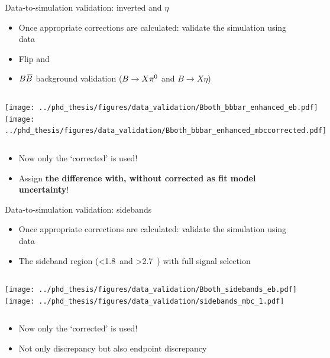 \documentclass[xcolor=dvipsnames]{beamer}
\begin{document}
\begin{frame}{Data-to-simulation validation: inverted \piz and $\eta$}
   \scriptsize\centering
   \begin{itemize}
      \item Once appropriate corrections are calculated: validate the simulation using data
      \item Flip \piVeto and \etaVeto
      \item[\ra]  $B\kern 0.18em\overline{\kern -0.18em B}{}$ background validation ($B\rightarrow X \pi^0$ and $B\to X \eta$)
   \end{itemize}

   \begin{columns}
      \texttt{[image: ../phd\_thesis/figures/data\_validation/Bboth\_bbbar\_enhanced\_eb.pdf]}
      \texttt{[image: ../phd\_thesis/figures/data\_validation/Bboth\_bbbar\_enhanced\_mbccorrected.pdf]}
   \end{columns}

   \begin{itemize}
      \item Now only the `corrected' \Mbc is used!
      \item Assign \textbf{the difference with, without corrected \Mbc as fit model uncertainty}!
   \end{itemize}

\end{frame}

\begin{frame}{Data-to-simulation validation: sidebands}
   \scriptsize\centering
   \begin{itemize}
      \item Once appropriate corrections are calculated: validate the simulation using data
      \item The sideband region (\EB<1.8~\gev and \EB>2.7~\gev) with full signal selection
   \end{itemize}

   \begin{columns}
      \texttt{[image: ../phd\_thesis/figures/data\_validation/Bboth\_sidebands\_eb.pdf]}
      \texttt{[image: ../phd\_thesis/figures/data\_validation/sidebands\_mbc\_1.pdf]}
   \end{columns}

   \begin{itemize}
      \item Now only the `corrected' \Mbc is used!
      \item Not only \Mbc discrepancy but also endpoint discrepancy
   \end{itemize}

\end{frame}
\end{document}
